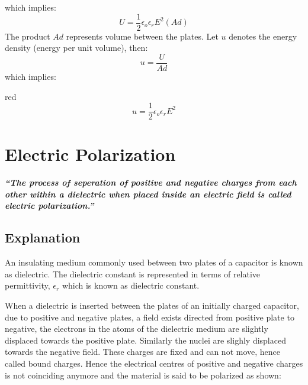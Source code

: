 which implies:
\begin{equation}\nonumber
U = \frac{1}{2}\epsilon_{o}\epsilon_{r}E^{2}(Ad)
\end{equation}
The product $Ad$ represents volume between the plates.
Let $u$ denotes the energy density (energy per unit volume), then:
\begin{equation}\nonumber
  u = \frac{U}{Ad}
\end{equation}
which implies:
\begin{mybox}{red}{}
  \begin{equation}\label{eq:11.82}
    u = \frac{1}{2}\epsilon_{o}\epsilon_{r}E^{2}
  \end{equation}
\end{mybox}
\section{Electric Polarization}
\textit{\textbf{
  “The process of seperation of positive and negative charges from each other within a
  dielectric when placed inside an electric field is called electric polarization.”
}}
\subsection*{Explanation}
An insulating medium commonly used between two plates of a capacitor
is known as dielectric. The dielectric constant is represented in terms of
relative permittivity, $\epsilon_{r}$ which is known as dielectric constant.

When a dielectric is inserted between the plates of an initially charged
capacitor, due to positive and negative plates, a field exists directed
from positive plate to negative, the electrons in the atoms of the
dielectric medium are slightly displaced towards the positive plate.
Similarly the nuclei are slighly displaced towards the negative field.
These charges are fixed and can not move, hence called bound charges.
Hence the electrical centres of positive and negative charges is not
coinciding anymore and the material is said to be polarized as shown:

